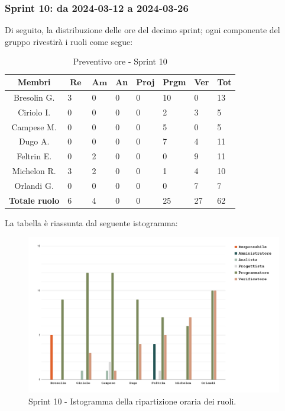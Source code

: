 \documentclass[10pt, a4paper]{article}
\begin{document}
{{{{{{{{{{{{{{{{{\subsubsection{Sprint 10: da 2024-03-12 a 2024-03-26}
Di seguito, la distribuzione delle ore del decimo sprint; ogni componente del gruppo rivestirà i ruoli come segue:
\begin{table}[H]
\begin{tabularx}{\textwidth}{c|X|X|X|X|X|X|X}
        \textbf{Membri} & $\operatorname{\textbf{Re}}$ & $\mathrm{\textbf{Am}}$ & \textbf{An} & \textbf{Proj} & \textbf{Prgm} & \textbf{Ver} & \textbf{Tot} \\
        \hline Bresolin G. & 3 & 0 & 0 & 0 & \cellcolor{primarycolor}10 & 0 & 13 \\
        \hline Ciriolo I.  & 0 & 0 & 0 & 0 & 2 & \cellcolor{primarycolor}3 & 5 \\
        \hline Campese M.  & 0 & 0 & 0 & 0 & \cellcolor{primarycolor}5 & 0 & 5 \\
        \hline Dugo A.     & 0 & 0 & 0 & 0 & \cellcolor{primarycolor}7 & 4 & 11 \\
        \hline Feltrin E.  & 0 & 2 & 0 & 0 & 0 & \cellcolor{primarycolor}9 & 11 \\
        \hline Michelon R. & \cellcolor{primarycolor}3 & 2 & 0 & 0 & 1 & 4 & 10 \\
        \hline Orlandi G.  & 0 & 0 & 0 & 0 & 0 & \cellcolor{primarycolor}7 & 7 \\
        \hline
        \textbf{Totale ruolo} & 6 & 4 & 0 & 0 & 25 & 27 & 62 
    \end{tabularx}
    \caption{Preventivo ore - Sprint 10}
    \end{table}

La tabella è riassunta dal seguente istogramma:
 \begin{figure}[H]
        \centering        
        \includegraphics[width=15.5cm]{istogrammi/istogramma_10_periodo.png}
        \caption{Sprint 10 - Istogramma della ripartizione oraria dei ruoli. }
    \end{figure}

}}}}}}}}}}}}}}}}}
\end{document}

